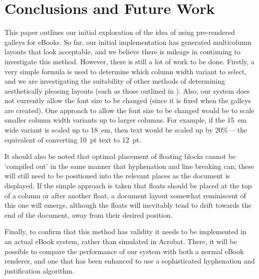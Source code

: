 \section{Conclusions and Future Work}
This paper outlines our initial exploration of the idea of using pre-rendered galleys for eBooks. So
far,  our initial implementation has generated multicolumn layouts that look acceptable, and we
believe there is mileage in continuing to investigate this method. However, there is still a lot of
work to be done. Firstly, a very simple formula is used to determine which column width variant to
select, and we are investigating the suitability of other methods of determining aesthetically
pleasing layouts (such as those outlined in
\cite{Balinsky2009,Bringhurst2008,Goldenberg2002,Harrington2004,Johari1996,Purvis2003}). Also, our
system does not currently allow the font size to be changed (since it is fixed when the galleys are
created). One approach to allow the font size to be changed would be to scale smaller column width
variants up to larger columns. For example, if the 15~em wide variant is scaled up to 18~em, then
text would be scaled up by 20\%\,---\,the equivalent of converting 10~pt text to 12~pt.

It should also be noted that optimal placement of floating blocks cannot be `compiled out' in the
same manner that hyphenation and line breaking can; these will still need to be positioned into the
relevant places as the document is displayed. If the simple approach is taken that floats should be
placed at the top of a column or after another float, a document layout somewhat reminiscent of this
one will emerge, although the floats will inevitably tend to drift towards the end of the document,
away from their desired position.

Finally, to confirm that this method has validity it needs to be implemented in an actual eBook
system, rather than simulated in Acrobat. There, it will be possible to compare the performance of
our system with both a normal eBook renderer, and one that has been enhanced to use a sophisticated
hyphenation and justification algorithm.






